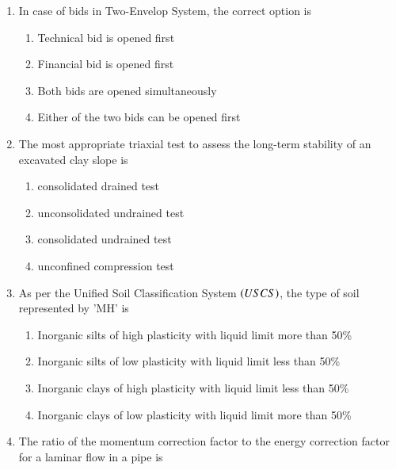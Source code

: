 \documentclass[journal,12pt,onecolumn]{article}
\theoremstyle{remark}
\begin{document}
\begin{enumerate}
\item In case of bids in Two-Envelop System, the correct option is

\hfill{}

\begin{enumerate}
    \item Technical bid is opened first
    \item Financial bid is opened first
    \item Both  bids are opened simultaneously
    \item Either of the two  bids can be opened first
\end{enumerate}

\item The most appropriate triaxial test to assess the long-term stability of an excavated clay slope is

\hfill{}

\begin{enumerate}
    \item consolidated drained test
    \item unconsolidated undrained test
    \item consolidated undrained test
    \item unconfined compression test
\end{enumerate}

\item As per the Unified Soil Classification System $\left(USCS\right)$, the type of soil represented by 'MH' is

\hfill{}

\begin{enumerate}
    \item Inorganic silts of high plasticity with liquid limit more than 50\%
    \item Inorganic silts of low plasticity with liquid limit less than 50\%
    \item Inorganic clays of high plasticity with liquid limit less than 50\%
    \item Inorganic clays of low plasticity with liquid limit more than 50\%
\end{enumerate}

\item The ratio of the momentum correction factor to the energy correction factor for a laminar flow in a pipe is


\end{enumerate}
\end{document}
